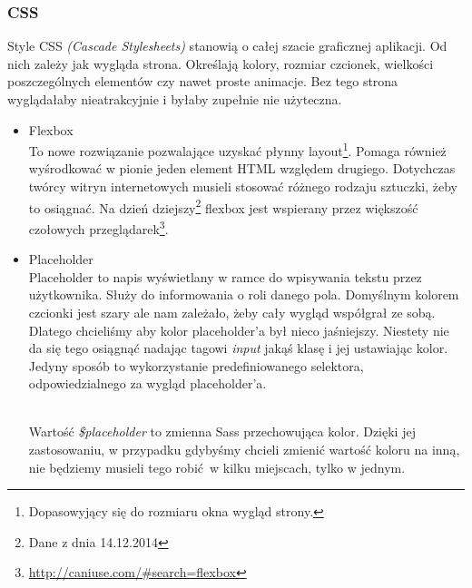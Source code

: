       \subsubsection{CSS}
        Style CSS \emph{(Cascade Stylesheets)} stanowią o całej szacie graficznej aplikacji. Od nich zależy jak wygląda strona. Określają kolory, rozmiar czcionek, wielkości poszczególnych elementów czy nawet proste animacje. Bez tego strona wyglądałaby nieatrakcyjnie i byłaby zupełnie nie użyteczna.
        \begin{itemize}
          \item Flexbox\\
            To nowe rozwiązanie pozwalające uzyskać płynny layout\footnote{Dopasowyjący się do rozmiaru okna wygląd strony.}. Pomaga również wyśrodkować w pionie jeden element HTML względem drugiego. Dotychczas twórcy witryn internetowych musieli stosować różnego rodzaju sztuczki, żeby to osiągnać. Na dzień dziejszy\footnote{Dane z dnia 14.12.2014} flexbox jest wspierany przez większość czołowych przeglądarek\footnote{\url{http://caniuse.com/\#search=flexbox}}. \\
            
          \item Placeholder\\
            Placeholder to napis wyświetlany w ramce do wpisywania tekstu przez użytkownika. Służy do informowania o roli danego pola. Domyślnym kolorem czcionki jest szary ale nam zależało, żeby cały wygląd współgrał ze sobą. Dlatego chcieliśmy aby kolor placeholder'a był nieco jaśniejszy. Niestety nie da się tego osiągnąć nadając tagowi \emph{input} jakąś klasę i jej ustawiając kolor. Jedyny sposób to wykorzystanie predefiniowanego selektora, odpowiedzialnego za wygląd placeholder'a.

            \begin{code}
              
            \end{code}\\

            Wartość \emph{\$placeholder} to zmienna Sass przechowująca kolor. Dzięki jej zastosowaniu, w przypadku gdybyśmy chcieli zmienić wartość koloru na inną, nie będziemy musieli tego robić w kilku miejscach, tylko w jednym.


\end{itemize}
